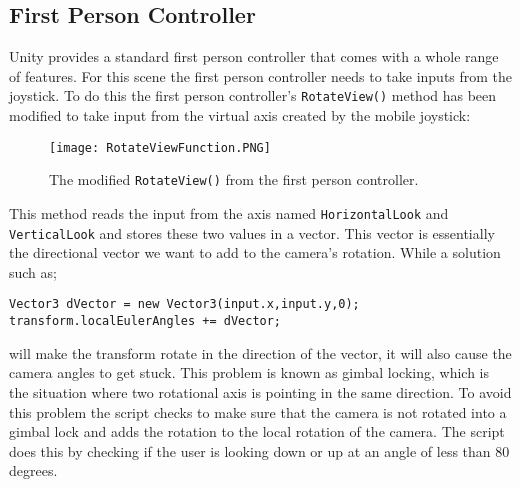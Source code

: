 \subsection*{First Person Controller}
Unity provides a standard first person controller that comes with a whole range of features. For this scene the first person controller needs to take inputs from the joystick. To do this the first person controller's {\tt RotateView()} method has been modified to take input from the virtual axis created by the mobile joystick:

\begin{figure}[H]
\centering
\texttt{[image: RotateViewFunction.PNG]}
\caption{The modified {\tt RotateView()} from the first person controller.}
\end{figure}

This method reads the input from the axis named {\tt HorizontalLook} and {\tt VerticalLook} and stores these two values in a vector. This vector is essentially the directional vector we want to add to the camera's rotation. While a solution such as;
\begin{verbatim}
Vector3 dVector = new Vector3(input.x,input.y,0);
transform.localEulerAngles += dVector;
\end{verbatim} will make the transform rotate in the direction of the vector, it will also cause the camera angles to get stuck. This problem is known as gimbal locking, which is the situation where two rotational axis is pointing in the same direction. To avoid this problem the script checks to make sure that the camera is not rotated into a gimbal lock and adds the rotation to the local rotation of the camera. The script does this by checking if the user is looking down or up at an angle of less than 80 degrees. 